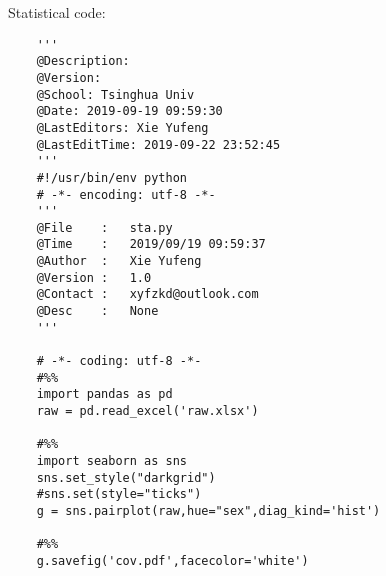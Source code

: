 \documentclass[fancy,11pt,twocol]{elegantbook}
\begin{document}
Statistical code:
\begin{lstlisting}
	'''
	@Description: 
	@Version: 
	@School: Tsinghua Univ
	@Date: 2019-09-19 09:59:30
	@LastEditors: Xie Yufeng
	@LastEditTime: 2019-09-22 23:52:45
	'''
	#!/usr/bin/env python
	# -*- encoding: utf-8 -*-
	'''
	@File    :   sta.py
	@Time    :   2019/09/19 09:59:37
	@Author  :   Xie Yufeng 
	@Version :   1.0
	@Contact :   xyfzkd@outlook.com
	@Desc    :   None
	'''
	
	# -*- coding: utf-8 -*-
	#%%
	import pandas as pd
	raw = pd.read_excel('raw.xlsx')
	
	#%%
	import seaborn as sns
	sns.set_style("darkgrid")
	#sns.set(style="ticks")
	g = sns.pairplot(raw,hue="sex",diag_kind='hist')
	
	#%%
	g.savefig('cov.pdf',facecolor='white')
	

\end{lstlisting}
\end{document}

